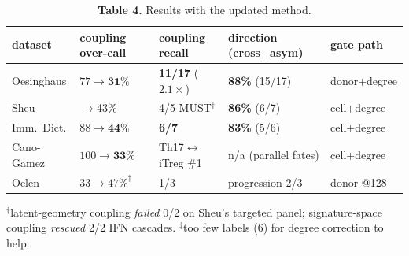 \documentclass[11pt]{article}
\begin{document}
\begin{table}[h]\centering\small
\caption*{\textbf{Table 4.} Results with the updated method.}
\begin{tabular}{lllll}
\toprule
dataset & coupling over-call & coupling recall & direction (cross\_asym) & gate path \\
\midrule
Oesinghaus & $77\to\textbf{31}\%$ & \textbf{11/17} ($2.1\times$) & \textbf{88\%} (15/17) & donor+degree \\
Sheu & $\to$43\% & 4/5 MUST$^\dagger$ & \textbf{86\%} (6/7) & cell+degree \\
Imm.\ Dict. & $88\to\textbf{44}\%$ & \textbf{6/7} & \textbf{83\%} (5/6) & cell+degree \\
Cano-Gamez & $100\to\textbf{33}\%$ & Th17$\leftrightarrow$iTreg \#1 & n/a (parallel fates) & cell+degree \\
Oelen & $33\to47\%^\ddagger$ & 1/3 & progression 2/3 & donor @128 \\
\bottomrule
\end{tabular}
\end{table}
\vspace{-0.7em}
{\footnotesize $^\dagger$latent-geometry coupling \emph{failed} 0/2 on Sheu's targeted panel;
signature-space coupling \emph{rescued} 2/2 IFN cascades. $^\ddagger$too few labels (6) for degree
correction to help.}
\end{document}
